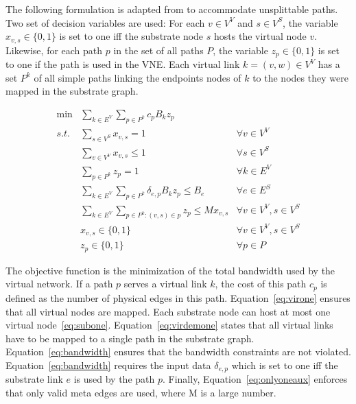 \documentclass[article]{llncs}
\begin{document}
The following formulation is adapted from \cite{hu:2013} to accommodate unsplittable paths. 
Two set of decision variables are used: For each $v \in V^{V}$ and $s \in V^{S}$, the variable $x_{v,s} \in \{0,1\}$ is set to one iff the substrate node $s$ hosts the virtual node $v$. 
Likewise, for each path $p$ in the set of all paths $P$, the variable $z_{p} \in \{0,1\}$ is set to one if the path is used in the VNE. 
Each virtual link $k=(v,w) \in V^V$ has a set $P^k$ of all simple paths linking the endpoints nodes of $k$ to the nodes they were mapped in the substrate graph.

\begin{align}
  \min  & \sum\limits_{k \in E^{V}}\sum\limits_{p \in P^k}  c_{p} B_k z_{p} \label{eq:obj} \\
  s.t.  & \sum\limits_{s \in V^{S}} x_{v,s} = 1                                  & \forall v \in V^{V} \label{eq:virone} \\
        & \sum\limits_{v \in V^{V}} x_{v,s} \leq 1                               & \forall s \in V^{S} \label{eq:subone} \\
        & \sum\limits_{p \in P^{k}} z_{p} = 1                                    & \forall k \in E^{V} \label{eq:virdemone} \\
        & \sum\limits_{k \in E^{V}}\sum\limits_{p \in P^{k}} \delta_{e,p} B_{k} z_{p} \leq B_{e} & \forall e \in E^{S} \label{eq:bandwidth} \\
        & \sum\limits_{k \in E^{V}}\sum\limits_{p \in P^k : (v,s) \in p} z_{p} \leq M x_{v,s} & \forall v \in V^{V}, s \in V^{S} \label{eq:onlyoneaux}\\
        &  x_{v,s} \in \{0,1\}  & \forall v \in V^{V}, s \in V^{S} \nonumber \\
        & z_{p} \in \{0,1\}    & \forall p \in {P} \nonumber
\end{align}

The objective function is the minimization of the total bandwidth used by the virtual network. If a path $p$ serves a virtual link $k$, the cost of this path $c_{p}$ is defined as the number of physical edges in this path.
Equation~\eqref{eq:virone} ensures that all virtual nodes are mapped. Each substrate node can host at most one virtual node~\eqref{eq:subone}.
Equation~\eqref{eq:virdemone} states that all virtual links have to be mapped to a single path in the substrate graph. Equation~\eqref{eq:bandwidth} ensures that the bandwidth constraints are not violated.
Equation~\ref{eq:bandwidth} requires the input data $\delta_{e,p}$ which is set to one iff the substrate link $e$ is used by the path $p$.
Finally, Equation~\eqref{eq:onlyoneaux} enforces that only valid meta edges are used, where M is a large number.
\end{document}
